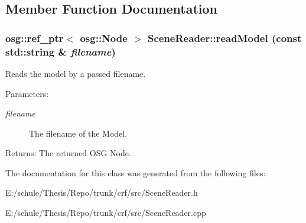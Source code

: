 \subsection{Member Function Documentation}
\hypertarget{a00015_8ca1f3b1c2a9940175cc4d978ad68098}{
\subsubsection[{readModel}]{\setlength{\rightskip}{0pt plus 5cm}osg::ref\_\-ptr$<$ osg::Node $>$ SceneReader::readModel (const std::string \& {\em filename})}}
\label{a00015_8ca1f3b1c2a9940175cc4d978ad68098}


Reads the model by a passed filename. 

\begin{Desc}
\item[Parameters:]
\begin{description}
\item[{\em filename}]The filename of the Model. \end{description}
\end{Desc}
\begin{Desc}
\item[Returns:]The returned OSG Node. \end{Desc}


The documentation for this class was generated from the following files:\begin{CompactItemize}
\item 
E:/schule/Thesis/Repo/trunk/crf/src/SceneReader.h\item 
E:/schule/Thesis/Repo/trunk/crf/src/SceneReader.cpp\end{CompactItemize}

